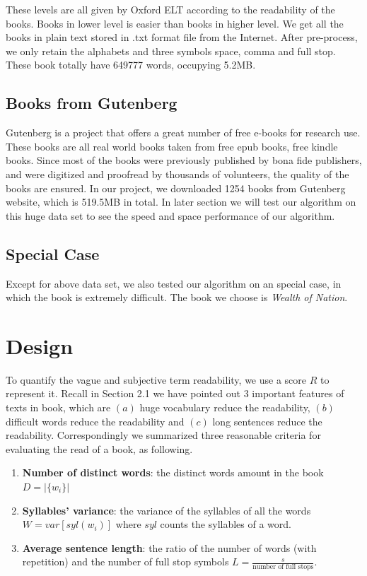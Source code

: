 \documentclass{article}
\begin{document}
These levels are all given by Oxford ELT according to the readability of the books. Books in lower level is easier than books in higher level.
\newline
\newline
We get all the books in plain text stored in .txt format file from the Internet. After pre-process, we only retain the alphabets and three symbols space, comma and full stop. These book totally have 649777 words, occupying 5.2MB.

\subsection{Books from Gutenberg}
Gutenberg is a project that offers a great number of free e-books for research use. These books are all real world books taken from free epub books, free kindle books. Since most of the books were previously published by bona fide publishers, and were digitized and proofread by thousands of volunteers, the quality of the books are ensured.
\newline
\newline
In our project, we downloaded 1254 books from Gutenberg website, which is 519.5MB in total. In later section we will test our algorithm on this huge data set to see the speed and space performance of our algorithm.

\subsection{Special Case}
Except for above data set, we also tested our algorithm on an special case, in which the book is extremely difficult. The book we choose is \textit{Wealth of Nation}\cite{wealth}.


\section{Design}
	To quantify the vague and subjective term readability, we use a score $R$ to represent it. Recall in Section 2.1 we have pointed out 3 important features of texts in book, which are $(a)$ huge vocabulary reduce the readability, $(b)$ difficult words reduce the readability and $(c)$ long sentences reduce the readability. Correspondingly we summarized three reasonable criteria for evaluating the read of a book, as following.
	\begin{enumerate}
		\item \textbf{Number of distinct words}: the distinct words amount in the book $D = |\{w_i\}|$
		\item \textbf{Syllables' variance}: the variance of the syllables of all the words 
			$W = var[syl(w_i)]$ where $syl$ counts the syllables of a word.
		\item \textbf{Average sentence length}: the ratio of the number of words (with repetition) and the number of full stop symbols
			$L = \frac{s}{\textrm{number of full stops}}$.
	\end{enumerate}
	
\end{document}
